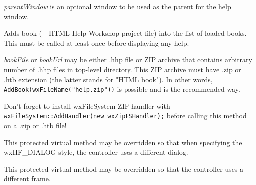 {\it parentWindow} is an optional window to be used as the parent for the help window.

\label{wxhtmlhelpcontrolleraddbook}



Adds book ( - HTML Help Workshop project file) into the list of loaded books.
This must be called at least once before displaying  any help.

{\it bookFile} or {\it bookUrl}  may be either .hhp file or ZIP archive
that contains arbitrary number of .hhp files in 
top-level directory. This ZIP archive must have .zip or .htb extension
(the latter stands for "HTML book"). In other words, {\tt AddBook(wxFileName("help.zip"))} 
is possible and is the recommended way.




Don't forget to install wxFileSystem ZIP handler with
{\tt wxFileSystem::AddHandler(new wxZipFSHandler);} before calling this method
on a .zip or .htb file!

\label{wxhtmlhelpcontrollercreatehelpdialog}


This protected virtual method may be overridden so that when specifying the wxHF\_DIALOG style, the controller
uses a different dialog.

\label{wxhtmlhelpcontrollercreatehelpframe}


This protected virtual method may be overridden so that the controller
uses a different frame.

